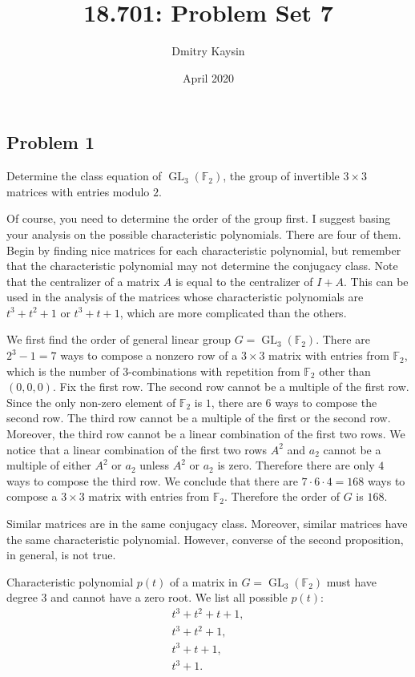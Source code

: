 \documentclass{article}
\title{18.701: Problem Set 7}
\author{Dmitry Kaysin}
\date{April 2020}
\theoremstyle{definition}
\newcommand{\F}{\mathbb{F}}
\newcommand{\GL}{\operatorname{GL}}
\begin{document}
\maketitle 


\subsection*{Problem 1}

\begin{tcolorbox}
Determine the class equation of $\GL_3(\F_2)$, the group of invertible $3 \times 3$ matrices with entries modulo $2$.

Of course, you need to determine the order of the group first.
I suggest basing your analysis on the possible characteristic polynomials.
There are four of them.
Begin by finding nice matrices for each characteristic polynomial, but remember that the characteristic polynomial may not determine the conjugacy class.
Note that the centralizer of a matrix $A$ is equal to the centralizer of $I+A$.
This can be used in the analysis of the matrices whose characteristic polynomials are $t^3 + t^2 + 1$ or $t^3 + t + 1$, which are more complicated
than the others.
\end{tcolorbox}

We first find the order of general linear group $G = \GL_3(\F_2)$.
There are $2^3-1 = 7$ ways to compose a nonzero row of a $3 \times 3$ matrix with entries from $\F_2$, which is the number of $3$-combinations with repetition from $\F_2$ other than $(0,0,0)$.
Fix the first row.
The second row cannot be a multiple of the first row.
Since the only non-zero element of $\F_2$ is $1$, there are $6$ ways to compose the second row.
The third row cannot be a multiple of the first or the second row.
Moreover, the third row cannot be a linear combination of the first two rows.
We notice that a linear combination of the first two rows $A^2$ and $a_2$ cannot be a multiple of either $A^2$ or $a_2$ unless $A^2$ or $a_2$ is zero.
Therefore there are only $4$ ways to compose the third row.
We conclude that there are $7 \cdot 6 \cdot 4 = 168$ ways to compose a $3 \times 3$ matrix with entries from $\F_2$.
Therefore the order of $G$ is $168$.

Similar matrices are in the same conjugacy class.
Moreover, similar matrices have the same characteristic polynomial.
However, converse of the second proposition, in general, is not true.

Characteristic polynomial $p(t)$ of a matrix in $G = \GL_3(\F_2)$ must have degree $3$ and cannot have a zero root.
We list all possible $p(t)$:
\begin{gather}
    t^3 + t^2 + t + 1, \\
    t^3 + t^2 + 1, \\
    t^3 + t + 1, \\
    t^3 + 1.
\end{gather}
\end{document}
